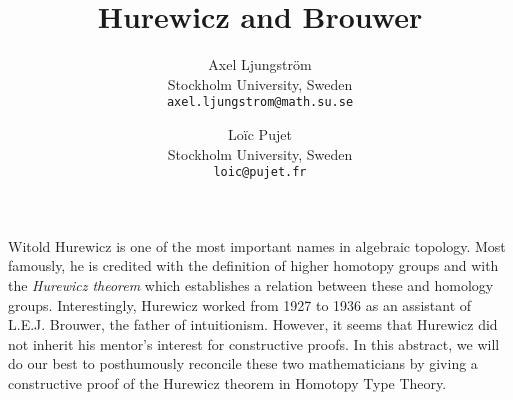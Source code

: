 \documentclass[a4page]{article}
\title{Hurewicz and Brouwer}
\author{
  Axel Ljungström\\
  \footnotesize{Stockholm University, Sweden}\\
  \footnotesize{\texttt{axel.ljungstrom@math.su.se}}
  \and
  Loïc Pujet\\
  \footnotesize{Stockholm University, Sweden}\\
  \footnotesize{\texttt{loic@pujet.fr}}
}
\date{}
\begin{document}
\maketitle
\vspace{-.5cm}
%
Witold Hurewicz is one of the most important names in algebraic topology.
Most famously, he is credited with the definition of higher homotopy groups and with the
\emph{Hurewicz theorem} which establishes a relation between these and homology groups.
%
Interestingly, Hurewicz worked from 1927 to 1936 as an assistant of L.E.J. Brouwer,
the father of intuitionism.
%
However, it seems that Hurewicz did not inherit his mentor's interest for constructive proofs.
%
In this abstract, we will do our best to posthumously reconcile these two mathematicians
by giving a constructive proof of the Hurewicz theorem in Homotopy Type Theory.
\end{document}
